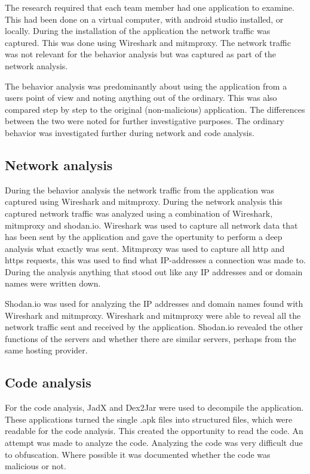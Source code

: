 The research required that each team member had one application to examine.
This had been done on a virtual computer, with android studio installed, or locally.
During the installation of the application the network traffic was captured.
This was done using Wireshark and mitmproxy.
The network traffic was not relevant for the behavior analysis but was captured as part of the network analysis.

The behavior analysis was predominantly about using the application from a users point of view and noting anything out of the ordinary.
This was also compared step by step to the original (non-malicious) application.
The differences between the two were noted for further investigative purposes.
The ordinary behavior was investigated further during network and code analysis.

\subsection{Network analysis}

During the behavior analysis the network traffic from the application was captured using Wireshark and mitmproxy.
During the network analysis this captured network traffic was analyzed using a combination of Wireshark, mitmproxy and shodan.io.
Wireshark was used to capture all network data that has been sent by the application and gave the opertunity to perform a deep analysis what exactly was sent.
Mitmproxy was used to capture all http and https requests, this was used to find what IP-addresses a connection was made to.
During the analysis anything that stood out like any IP addresses and or domain names were written down.

Shodan.io was used for analyzing the IP addresses and domain names found with Wireshark and mitmproxy.
Wireshark and mitmproxy were able to reveal all the network traffic sent and received by the application.
Shodan.io revealed the other functions of the servers and whether there are similar servers, perhaps from the same hosting provider.

\subsection{Code analysis}

For the code analysis, JadX and Dex2Jar were used to decompile the application.
These applications turned the single .apk files into structured files, which were readable for the code analysis.
This created the opportunity to read the code.
An attempt was made to analyze the code.
Analyzing the code was very difficult due to obfuscation.
Where possible it was documented whether the code was malicious or not.

